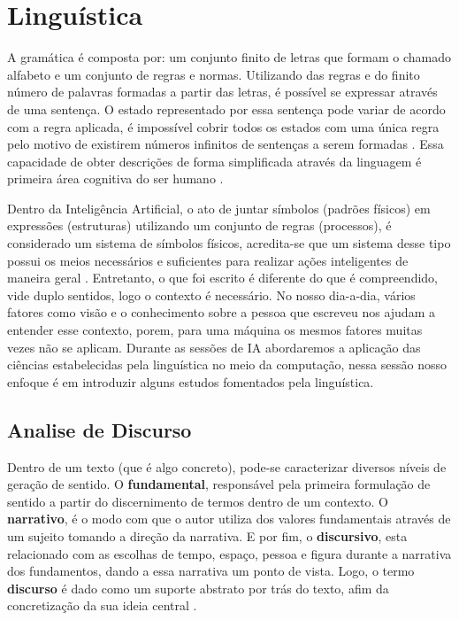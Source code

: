 \section{Linguística}
A gramática é composta por: um conjunto finito de letras que formam o chamado alfabeto e um conjunto de regras e normas. Utilizando das regras e do finito número de palavras formadas a partir das letras, é possível se expressar através de uma sentença. O estado representado por essa sentença pode variar de acordo com a regra aplicada, é impossível cobrir todos os estados com uma única regra pelo motivo de existirem números infinitos de sentenças a serem formadas \cite[13-25]{chomsky2002syntactic}. Essa capacidade de obter descrições de forma simplificada através da linguagem é primeira área cognitiva do ser humano \cite[131]{putnam1975mind}.

Dentro da Inteligência Artificial, o ato de juntar símbolos (padrões físicos) em expressões (estruturas) utilizando um conjunto de regras (processos), é considerado um sistema de símbolos físicos, acredita-se que um sistema desse tipo possui os meios necessários e suficientes para realizar ações inteligentes de maneira geral \cite[116]{newell1976ComputerSA}. Entretanto, o que foi escrito é diferente do que é compreendido, vide duplo sentidos, logo o contexto é necessário. No nosso dia-a-dia, vários fatores como visão e o conhecimento sobre a pessoa que escreveu nos ajudam a entender esse contexto, porem, para uma máquina os mesmos fatores muitas vezes não se aplicam. Durante as sessões de IA abordaremos a aplicação das ciências estabelecidas pela linguística no meio da computação, nessa sessão nosso enfoque é em introduzir alguns estudos fomentados pela linguística.


\subsection{Analise de Discurso}
Dentro de um texto (que é algo concreto), pode-se caracterizar diversos níveis de geração de sentido. O \textbf{fundamental}, responsável pela primeira formulação de sentido a partir do discernimento de termos dentro de um contexto. O \textbf{narrativo}, é o modo com que o autor utiliza dos valores fundamentais através de um sujeito tomando a direção da narrativa. E por fim, o \textbf{discursivo}, esta relacionado com as escolhas de tempo, espaço, pessoa e figura durante a narrativa dos fundamentos, dando a essa narrativa um ponto de vista. Logo, o termo \textbf{discurso} é dado como um suporte abstrato por trás do texto, afim da concretização da sua ideia central \cite[13-17]{gregolin1995ad}.

